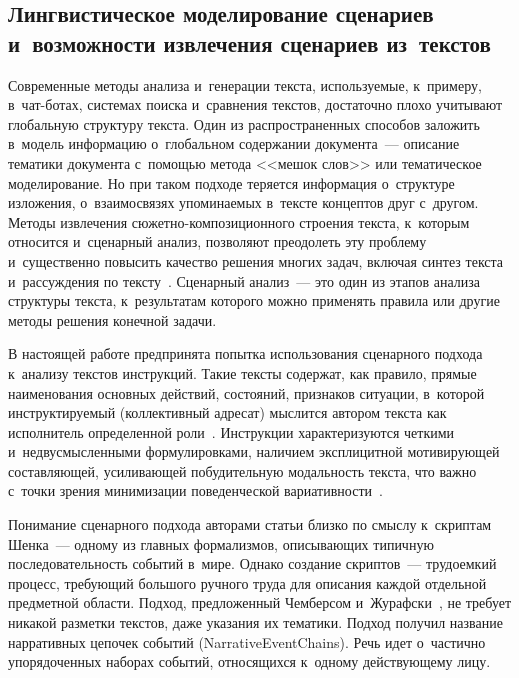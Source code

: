 \begin{multicols}{2}
  \subsection{Лингвистическое моделирование сценариев и~возможности 
извлечения сценариев из~текстов}
  
   Современные методы анализа и~генерации текс\-та, ис\-поль\-зу\-емые, к~примеру, 
в~чат-бо\-тах, системах поиска и~сравнения текс\-тов, достаточно плохо 
учитывают глобальную структуру текс\-та. Один из распространенных способов 
заложить в~модель информацию о~глобальном содержании документа~--- 
описание тематики документа с~по\-мощью метода <<мешок слов>> или 
тематическое моделирование. Но при таком подходе теряется информация 
о~структуре изложения, о~взаимосвязях упо\-ми\-на\-емых в~текс\-те концептов друг 
с~другом. Методы извлечения сю\-жет\-но-ком\-по\-зи\-ци\-он\-но\-го стро\-ения текс\-та, 
к~которым относится и~сценарный анализ, позволяют преодолеть эту проб\-ле\-му 
и~существенно повысить качество решения многих задач, вклю\-чая синтез 
текс\-та и~рассуждения по текс\-ту~\cite{10-sm}. Сценарный анализ~--- это один из 
этапов анализа структуры текс\-та, к~результатам которого можно применять 
правила или другие методы решения конечной задачи.
  
  В настоящей работе предпринята попытка использования сценарного 
подхода к~анализу текс\-тов инструкций. Такие текс\-ты содержат, как правило, 
прямые наименования основных действий, со\-сто\-яний, признаков ситуации, 
в~которой ин\-струк\-ти\-ру\-емый (коллективный адресат) мыс\-лит\-ся автором текста 
как исполнитель определенной роли~\cite{11-sm}. Инструкции 
характеризуются чет\-ки\-ми и~недвусмысленными формулировками, наличием 
эксплицитной мо\-ти\-ви\-ру\-ющей со\-став\-ля\-ющей, уси\-ли\-ва\-ющей побудительную 
мо\-даль\-ность текс\-та, что важ\-но с~точ\-ки зрения минимизации поведенческой 
ва\-ри\-а\-тив\-ности~\cite{9-sm, 11-sm}.
   
   Понимание сценарного подхода авторами \mbox{статьи} близко по смыслу 
к~скриптам Шенка~--- одному из глав\-ных формализмов, опи\-сы\-ва\-ющих 
типичную последовательность событий в~мире. Однако создание скриптов~--- 
трудоемкий процесс, тре\-бу\-ющий большого руч\-но\-го труда для описания каж\-дой 
отдельной предметной об\-ласти. Подход, предложенный Чем\-бер\-сом  
и~Журафски~\cite{12-sm}, не требует никакой разметки текс\-тов, даже указания 
их тематики. Подход получил название нарративных цепочек событий 
(NarrativeEventChains). Речь идет о~час\-тич\-но упорядоченных наборах событий, 
относящихся к~одному дей\-ст\-ву\-юще\-му лицу. 
   

\end{multicols}
